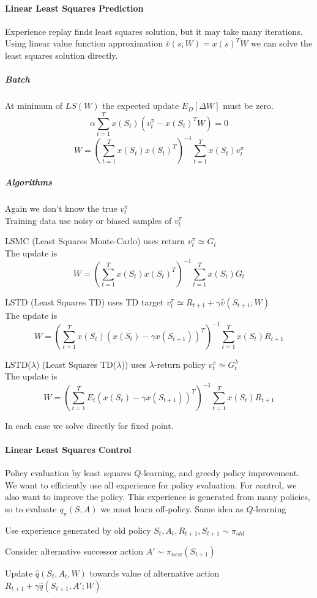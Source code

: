 \documentclass[10pt]{report}
\begin{document}
\paragraph{Linear Least Squares Prediction} Experience replay finds least squares solution, but it may take many iterations. Using linear value function approximation $\hat{v}(s;W) = x(s)^TW$ we can solve the least squares solution directly.
\subparagraph{Batch} At minimum of $LS(W)$ the expected update $E_D[\Delta W]$ must be zero.
$$\alpha\sum_{t=1}^T x(S_t)(v_t^\pi -x(S_t)^TW) = 0$$
$$W = \left(\sum_{t=1}^Tx(S_t)x(S_t)^T\right)^{-1}\sum_{t=1}^T x(S_t)v_t^\pi$$
\subparagraph{Algorithms} Again we don't know the true $v_t^\pi$\\
Training data use noisy or biased samples of $v_t^\pi$
\begin{list}{}{}
	\item LSMC (Least Squares Monte-Carlo) uses return $v_t^\pi\simeq G_t$\\
	The update is $$W = \left(\sum_{t=1}^Tx(S_t)x(S_t)^T\right)^{-1}\sum_{t=1}^Tx(S_t)G_t$$
	\item LSTD (Least Squares TD) uses TD target $v_t^\pi\simeq R_{t+1}+\gamma\hat{v}(S_{t+1};W)$\\
	The update is $$W = \left(\sum_{t=1}^Tx(S_t)(x(S_t)-\gamma x(S_{t+1}))^T\right)^{-1}\sum_{t=1}^Tx(S_t)R_{t+1}$$
	\item LSTD($\lambda$) (Least Squares TD($\lambda$)) uses $\lambda$-return policy $v_t^\pi\simeq G_t^\lambda$\\
	The update is $$W = \left(\sum_{t=1}^TE_t(x(S_t)-\gamma x(S_{t+1}))^T\right)^{-1}\sum_{t=1}^Tx(S_t)R_{t+1}$$
\end{list}
In each case we solve directly for fixed point.

\paragraph{Linear Least Squares Control} Policy evaluation by least squares $Q$-learning, and greedy policy improvement.\\
We want to efficiently use all experience for policy evaluation. For control, we also want to improve the policy. This experience is generated from many policies, so to evaluate $q_\pi(S,A)$ we must learn off-policy. Same idea as $Q$-learning
\begin{list}{}{}
	\item Use experience generated by old policy $S_t,A_t,R_{t+1},S_{t+1}\sim\pi_{old}$
	\item Consider alternative successor action $A'\sim\pi_{new}(S_{t+1})$
	\item Update $\hat{q}(S_t,A_t,W)$ towards value of alternative action $R_{t+1}+\gamma\hat{q}(S_{t+1},A';W)$
\end{list}
\end{document}
